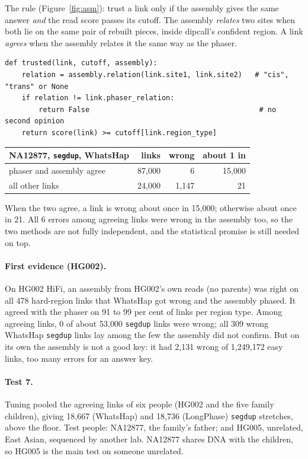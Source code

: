 \documentclass[11pt]{article}
\newcommand{\grp}[1]{\texttt{#1}}
\begin{document}
The rule (Figure~\ref{fig:asm}): trust a link only if the assembly gives
the same answer \emph{and} the read score passes its cutoff. The assembly \emph{relates} two sites when both lie on the same
pair of rebuilt pieces, inside dipcall's confident region. A link
\emph{agrees} when the assembly relates it the same way as the phaser.

\begin{lstlisting}
def trusted(link, cutoff, assembly):
    relation = assembly.relation(link.site1, link.site2)   # "cis", "trans" or None
    if relation != link.phaser_relation:
        return False                                        # no second opinion
    return score(link) >= cutoff[link.region_type]
\end{lstlisting}

\begin{center}
\small
\begin{tabular}{@{}lrrr@{}}
\toprule
NA12877, \grp{segdup}, WhatsHap & links & wrong & about 1 in\\
\midrule
phaser and assembly agree & 87{,}000 & 6 & 15{,}000\\
all other links & 24{,}000 & 1{,}147 & 21\\
\bottomrule
\end{tabular}
\end{center}

When the two agree, a link is wrong about once in 15{,}000; otherwise
about once in 21. All 6 errors among agreeing links were wrong in the
assembly too, so the two methods are not fully independent, and the
statistical promise is still needed on top.

\paragraph{First evidence (HG002).} On HG002 HiFi, an assembly
from HG002's own reads (no parents) was right on all 478 hard-region links
that WhatsHap got wrong and the assembly phased. It agreed with the phaser on
91 to 99 per cent of links per region type. Among agreeing links, 0 of about
53{,}000 \grp{segdup} links were wrong; all 309 wrong WhatsHap \grp{segdup}
links lay among the few the assembly did not confirm. But on its own the
assembly is not a good key: it had 2{,}131 wrong of 1{,}249{,}172 easy
links, too many errors for an answer key.

\paragraph{Test 7.} Tuning pooled the agreeing links of six people (HG002
and the five family children), giving 18{,}667 (WhatsHap) and 18{,}736
(LongPhase) \grp{segdup} stretches, above the floor. Test people: NA12877,
the family's father; and HG005, unrelated, East Asian, sequenced by another
lab. NA12877 shares DNA with the children, so HG005 is the main test on
someone unrelated.
\end{document}
